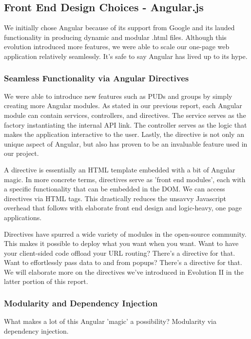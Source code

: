 \documentclass[a4paper]{article}
\begin{document}
\subsection{Front End Design Choices - Angular.js}

We initially chose Angular because of its support from Google and its lauded functionality in producing dynamic and modular .html files. Although this evolution introduced more features, we were able to scale our one-page web application relatively seamlessly. It's safe to say Angular has lived up to its hype.

\subsubsection{Seamless Functionality via Angular Directives}

We were able to introduce new features such as PUDs and groups by simply creating more Angular modules. As stated in our previous report, each Angular module can contain services, controllers, and directives. The service serves as the factory instantiating the internal API link. The controller serves as the logic that makes the application interactive to the user. Lastly, the directive is not only an unique aspect of Angular, but also has proven to be an invaluable feature used in our project. 

A directive is essentially an HTML template embedded with a bit of Angular magic. In more concrete terms, directives serve as 'front end modules', each with a specific functionality that can be embedded in the DOM. We can access directives via HTML tags. This drastically reduces the unsavvy Javascript overhead that follows with elaborate front end design and logic-heavy, one page applications.

Directives have spurred a wide variety of modules in the open-source community. This makes it possible to deploy what you want when you want. Want to have your client-sided code offload your URL routing? There's a directive for that. Want to effortlessly pass data to and from popups? There's a directive for that. We will elaborate more on the directives we've introduced in Evolution II in the latter portion of this report.

\subsubsection{Modularity and Dependency Injection}

What makes a lot of this Angular 'magic' a possibility? Modularity via dependency injection.
\end{document}
